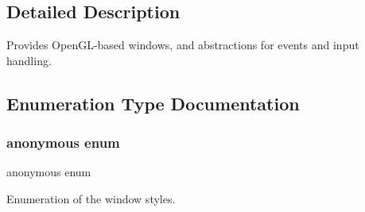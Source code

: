 \subsection{Detailed Description}
Provides Open\+G\+L-\/based windows, and abstractions for events and input handling. 

\subsection{Enumeration Type Documentation}
\mbox{\label{group__window_gaf2f7d60d9ff2bee891b47d8528c1d1ef}} 
\subsubsection{\texorpdfstring{anonymous enum}{anonymous enum}}
{\footnotesize\ttfamily anonymous enum}



Enumeration of the window styles. 


